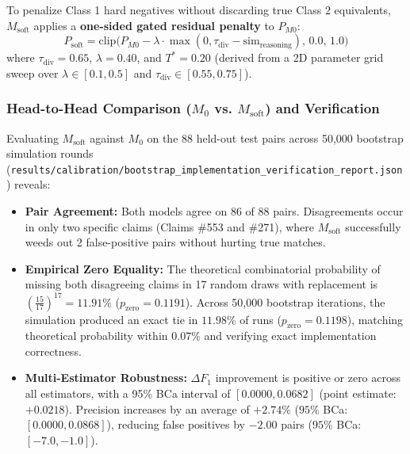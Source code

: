 \documentclass[11pt,a4paper]{article}
\begin{document}
To penalize Class 1 hard negatives without discarding true Class 2 equivalents, $M_{\text{soft}}$ applies a \textbf{one-sided gated residual penalty} to $P_{M0}$:
\begin{equation}
P_{\text{soft}} = \text{clip}\Big(P_{M0} - \lambda \cdot \max(0, \tau_{\text{div}} - \text{sim}_{\text{reasoning}}), \, 0.0, \, 1.0\Big)
\end{equation}
where $\tau_{\text{div}} = 0.65$, $\lambda = 0.40$, and $T^* = 0.20$ (derived from a 2D parameter grid sweep over $\lambda \in [0.1, 0.5]$ and $\tau_{\text{div}} \in [0.55, 0.75]$).

\subsubsection{Head-to-Head Comparison ($M_0$ vs. $M_{\text{soft}}$) and Verification}
Evaluating $M_{\text{soft}}$ against $M_0$ on the 88 held-out test pairs across 50,000 bootstrap simulation rounds (\texttt{results/calibration/bootstrap\_implementation\_verification\_report.json}) reveals:
\begin{itemize}[leftmargin=*,itemsep=1pt]
    \item \textbf{Pair Agreement:} Both models agree on 86 of 88 pairs. Disagreements occur in only two specific claims (Claims \#553 and \#271), where $M_{\text{soft}}$ successfully weeds out 2 false-positive pairs without hurting true matches.
    \item \textbf{Empirical Zero Equality:} The theoretical combinatorial probability of missing both disagreeing claims in 17 random draws with replacement is $\left(\frac{15}{17}\right)^{17} = \mathbf{11.91\%}$ ($p_{\text{zero}} = 0.1191$). Across 50,000 bootstrap iterations, the simulation produced an exact tie in $\mathbf{11.98\%}$ of runs ($p_{\text{zero}} = 0.1198$), matching theoretical probability within $0.07\%$ and verifying exact implementation correctness.
    \item \textbf{Multi-Estimator Robustness:} $\Delta F_1$ improvement is positive or zero across all estimators, with a 95\% BCa interval of $[0.0000, 0.0682]$ (point estimate: $+0.0218$). Precision increases by an average of $+2.74\%$ ($95\%$ BCa: $[0.0000, 0.0868]$), reducing false positives by $-2.00$ pairs ($95\%$ BCa: $[-7.0, -1.0]$).
\end{itemize}
\end{document}
